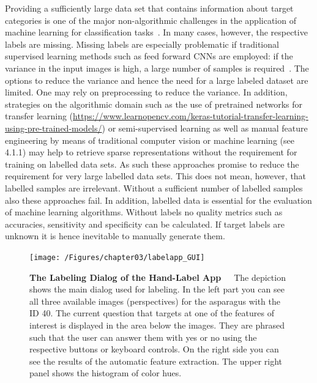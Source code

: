 Providing a sufficiently large data set that contains information about target categories is one of the major non-algorithmic challenges in the application of machine learning for classification tasks~\citep{al2018labeling}. In many cases, however, the respective labels are missing. Missing labels are especially problematic if traditional supervised learning methods such as feed forward CNNs are employed: if the variance in the input images is high, a large number of samples is required~\citep{russakovsky2015imagenet}. 
The options to reduce the variance and hence the need for a large labeled dataset are limited. One may rely on preprocessing to reduce the variance. In addition, strategies on the algorithmic domain such as the use of pretrained networks for transfer learning (\url{https://www.learnopencv.com/keras-tutorial-transfer-learning-using-pre-trained-models/}) or semi-supervised learning as well as manual feature engineering by means of traditional computer vision or machine learning (see 4.1.1) may help to retrieve sparse representations without the requirement for training on labelled data sets. As such these approaches promise to reduce the requirement for very large labelled data sets. This does not mean, however, that labelled samples are irrelevant. Without a sufficient number of labelled samples also these approaches fail. In addition, labelled data is essential for the evaluation of machine learning algorithms. Without labels no quality metrics such as accuracies, sensitivity and specificity can be calculated. If target labels are unknown it is hence inevitable to manually generate them. \\

\begin{figure}
	\centering
	\texttt{[image: /Figures/chapter03/labelapp\_GUI]}
	\decoRule
	\caption[The Labeling Dialog of the Hand-Label App]{\textbf{The Labeling Dialog of the Hand-Label App}~~~The depiction shows the main dialog used for labeling. In the left part you can see all three available images (perspectives) for the asparagus with the ID 40. The current question that targets at one of the features of interest is displayed in the area below the images. They are phrased such that the user can answer them with yes or no using the respective buttons or keyboard controls. On the right side you can see the results of the automatic feature extraction. The upper right panel shows the histogram of color hues.}
	\label{fig:LabelAppGUI}
\end{figure}

